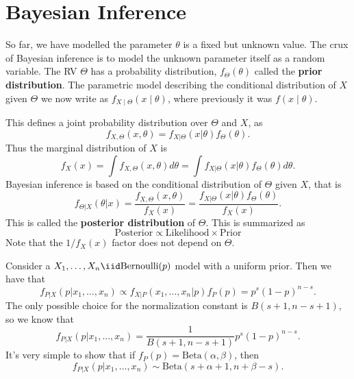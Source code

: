 \chapter{Bayesian Inference}
So far, we have modelled the parameter $\theta$ is a fixed but unknown value. The crux of Bayesian inference is to model the unknown parameter itself as a random variable. The RV $\Theta$ has a probability distribution, $f_\Theta(\theta)$ called the {\bf prior distribution}. The parametric model describing the conditional distribution of $X$ given $\Theta$ we now write as $f_{X\mid\Theta}(x\mid\theta)$, where previously it was $f(x\mid\theta)$. 

This defines a joint probability distribution over $\Theta$ and $X$, as
\[f_{X, \Theta}(x, \theta) = f_{X|\Theta}(x|\theta)f_\Theta(\theta). \]
Thus the marginal distribution of $X$ is 
\[f_X(x) = \int f_{X, \Theta}(x, \theta)d\theta = \int f_{X|\Theta}(x|\theta)f_{\Theta}(\theta)d\theta. \]
Bayesian inference is based on the conditional distribution of $\Theta$ given $X$, that is
\[f_{\Theta|X}(\theta|x) = \frac{f_{X,\Theta}(x,\theta)}{f_X(x)}=\frac{f_{X|\Theta}(x|\theta)f_{\Theta}(\theta)}{f_X(x)}.\]
This is called the {\bf posterior distribution} of $\Theta$. This is summarized as
\[\mathrm{Posterior}\propto\mathrm{Likelihood}\times\mathrm{Prior}\]
Note that the $1/f_X(x)$ factor does not depend on $\Theta$. 

\begin{example}
    Consider a $X_1, \dots, X_n \iid\mathrm{Bernoulli}(p)$ model with a uniform prior. Then we have that 
    \[f_{P|X}(p|x_1, \dots, x_n)\propto f_{X|P}(x_1, \dots, x_n|p)f_P(p) = p^s(1-p)^{n-s}. \]
    The only possible choice for the normalization constant is $B(s+1, n-s+1)$, so we know that 
    \[f_{P|X}(p|x_1, \dots, x_n) = \frac{1}{B(s+1, n-s+1)}p^s(1-p)^{n-s}. \]
    It's very simple to show that if $f_P(p) = \mathrm{Beta}(\alpha, \beta)$, then 
    \[f_{P|X}(p|x_1, \dots, x_n) \sim \mathrm{Beta}(s+\alpha+1, n+\beta-s). \]
\end{example}

